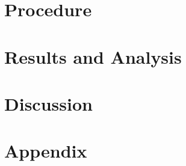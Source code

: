 \documentclass{article}
\begin{document}
	\section{Procedure}
	
	\section{Results and Analysis}
	
	\section{Discussion}
	
	\section{Appendix}
	
\end{document}
